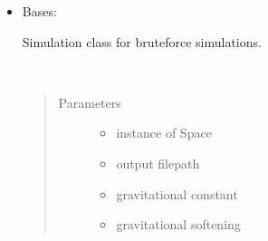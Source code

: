 \documentclass[letterpaper,10pt,english]{sphinxmanual}
\begin{document}
\begin{DUlineblock}{0em}
\item[] 
\end{DUlineblock}
\begin{itemize}
\item {} 

\begin{fulllineitems}
\label{\detokenize{simulator:nbody.simulator.simulation.PPSimulation}}
\sphinxAtStartPar
Bases: {\hyperref[\detokenize{simulator:nbody.simulator.simulation.SimulationBase}]{}}

\sphinxAtStartPar
Simulation class for brute\sphinxhyphen{}force simulations.

\begin{fulllineitems}
\label{\detokenize{simulator:nbody.simulator.simulation.PPSimulation.__init__}}~\begin{quote}\begin{description}
\item[{Parameters}] \leavevmode\begin{itemize}
\item {} 
\sphinxAtStartPar
{} \textendash{} instance of Space

\item {} 
\sphinxAtStartPar
{} \textendash{} output filepath

\item {} 
\sphinxAtStartPar
{} \textendash{} gravitational constant

\item {} 
\sphinxAtStartPar
{} \textendash{} gravitational softening


\end{itemize}
\end{description}
\end{quote}
\end{fulllineitems}
\end{fulllineitems}
\end{itemize}
\end{document}

